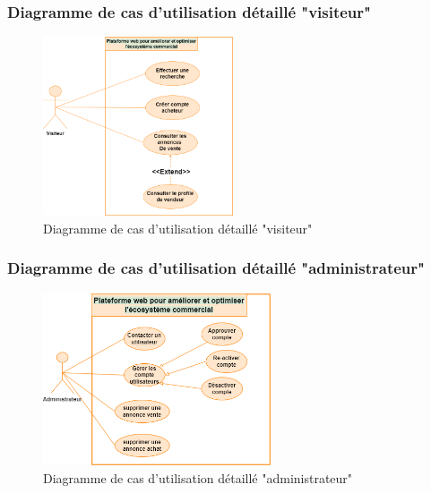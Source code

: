 \documentclass[edit,12pt,a4paper,ChapStyle,oneside,doubleinterligne]{report}
\begin{document}
\subsubsection{Diagramme de cas d'utilisation détaillé "visiteur" }
\begin{figure}[h!]\label{fig:Diagramme de cas d'utilisation détaillé "visiteur"}
\centering
\includegraphics[width=0.5\textwidth]{images/diagramme de cas v1.png}
\caption{Diagramme de cas d'utilisation détaillé "visiteur"}
\end{figure}
\subsubsection{Diagramme de cas d'utilisation détaillé "administrateur" }
\begin{figure}[h!]\label{fig:Diagramme de cas d'utilisation détaillé "administrateur"n}
\centering
\includegraphics[width=0.6\textwidth]{images/diagramme de cas a1.png}
\caption{Diagramme de cas d'utilisation détaillé "administrateur"}
\end{figure}
\newpage
\end{document}
